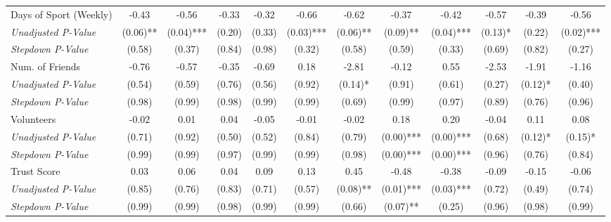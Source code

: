\begin{tabular}{l c c c c c c c c c c c}
Days of Sport (Weekly) & -0.43 & -0.56 & -0.33 & -0.32 & -0.66 & -0.62 & -0.37 & -0.42 & -0.57 & -0.39 & -0.56 \\
\quad \textit{Unadjusted P-Value} & (0.06)** & (0.04)*** & (0.20) & (0.33) & (0.03)*** & (0.06)** & (0.09)** & (0.04)*** & (0.13)* & (0.22) & (0.02)*** \\
\quad \textit{Stepdown P-Value} & (0.58) & (0.37) & (0.84) & (0.98) & (0.32) & (0.58) & (0.59) & (0.33) & (0.69) & (0.82) & (0.27) \\
Num. of Friends & -0.76 & -0.57 & -0.35 & -0.69 & 0.18 & -2.81 & -0.12 & 0.55 & -2.53 & -1.91 & -1.16 \\
\quad \textit{Unadjusted P-Value} & (0.54) & (0.59) & (0.76) & (0.56) & (0.92) & (0.14)* & (0.91) & (0.61) & (0.27) & (0.12)* & (0.40) \\
\quad \textit{Stepdown P-Value} & (0.98) & (0.99) & (0.98) & (0.99) & (0.99) & (0.69) & (0.99) & (0.97) & (0.89) & (0.76) & (0.96) \\
Volunteers & -0.02 & 0.01 & 0.04 & -0.05 & -0.01 & -0.02 & 0.18 & 0.20 & -0.04 & 0.11 & 0.08 \\
\quad \textit{Unadjusted P-Value} & (0.71) & (0.92) & (0.50) & (0.52) & (0.84) & (0.79) & (0.00)*** & (0.00)*** & (0.68) & (0.12)* & (0.15)* \\
\quad \textit{Stepdown P-Value} & (0.99) & (0.99) & (0.97) & (0.99) & (0.99) & (0.98) & (0.00)*** & (0.00)*** & (0.96) & (0.76) & (0.84) \\
Trust Score & 0.03 & 0.06 & 0.04 & 0.09 & 0.13 & 0.45 & -0.48 & -0.38 & -0.09 & -0.15 & -0.06 \\
\quad \textit{Unadjusted P-Value} & (0.85) & (0.76) & (0.83) & (0.71) & (0.57) & (0.08)** & (0.01)*** & (0.03)*** & (0.72) & (0.49) & (0.74) \\
\quad \textit{Stepdown P-Value} & (0.99) & (0.99) & (0.98) & (0.99) & (0.99) & (0.66) & (0.07)** & (0.25) & (0.96) & (0.98) & (0.99) \\
\bottomrule
\end{tabular}
